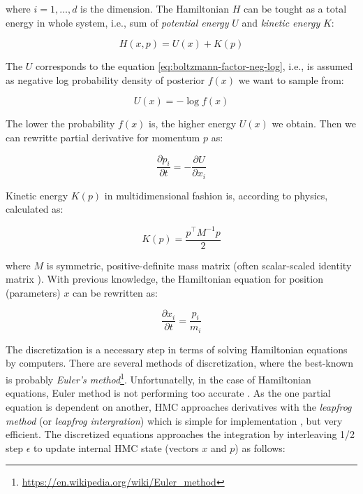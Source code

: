 \documentclass[
  digital, %
  oneside, %
  lof,     %
  lot,     %
]{fithesis4}
\begin{document}
where $i = 1, \dots, d$ is the dimension.
The Hamiltonian $H$ can be tought as a total energy in whole system,
i.e., sum of \textit{potential energy} $U$ and \textit{kinetic energy} $K$:

\begin{equation}
  H(x, p) = U(x) + K(p)
\end{equation}

The $U$ corresponds to the equation 
\ref{eq:boltzmann-factor-neg-log}, i.e., is assumed as negative log 
probability density of posterior $f(x)$ we want to sample from:

\begin{equation}
  U(x) = -\log f(x)
\end{equation}

The lower the probability $f(x)$ is, the higher 
energy $U(x)$ we obtain. 
Then we can rewritte partial derivative for momentum $p$ as:

\begin{equation}
  \frac{\partial p_i}{\partial t} = - \frac{\partial U}{\partial x_i}
\end{equation}

Kinetic energy $K(p)$ in 
multidimensional fashion is, according to physics, calculated as:

\begin{equation}
  K(p) = \frac{p^{\top} M^{-1} p}{2}
\end{equation}

where $M$ is symmetric, positive-definite mass 
matrix (often scalar-scaled identity matrix \cite{neal2011}).
With previous knowledge, the Hamiltonian 
equation for position (parameters) $x$ can be rewritten as:

\begin{equation}
  \frac{\partial x_i}{\partial t} = \frac{p_i}{m_i}
\end{equation}

The discretization is a necessary step in terms of 
solving Hamiltonian equations by computers.
There are several methods of discretization, where 
the best-known is probably \textit{Euler's method}\footnote{\url{https://en.wikipedia.org/wiki/Euler_method}}.
Unfortunatelly, in the case of Hamiltonian equations, 
Euler method is not performing too accurate 
\cite[Chapter 5]{neal2011}.
As the one partial equation is dependent on another,
HMC approaches derivatives with the
\textit{leapfrog method} (or \textit{leapfrog intergration}) which 
is simple for implementation \cite{betancourt2018}, but very efficient.
The discretized equations approaches the integration 
by interleaving 1/2 step $\epsilon$ to update internal
HMC state (vectors $x$ and $p$) as follows:
\end{document}
